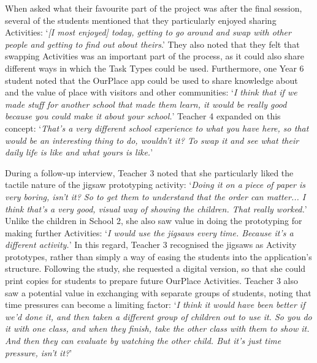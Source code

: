 \documentclass[,hyphens]{sigchi}
\begin{document}
When asked what their favourite part of the project was after the final session, several of the students mentioned that they particularly enjoyed sharing Activities: `\textit{[I most enjoyed] today, getting to go around and swap with other people and getting to find out about theirs}.' They also noted that they felt that swapping Activities was an important part of the process, as it could also share different ways in which the Task Types could be used. Furthermore, one Year 6 student noted that the OurPlace app could be used to share knowledge about and the value of place with visitors and other communities: `\textit{I think that if we made stuff for another school that made them learn, it would be really good because you could make it about your school.}' Teacher 4 expanded on this concept: `\textit{That's a very different school experience to what you have here, so that would be an interesting thing to do, wouldn't it? To swap it and see what their daily life is like and what yours is like.}' 

During a follow-up interview, Teacher 3 noted that she particularly liked the tactile nature of the jigsaw prototyping activity: `\textit{Doing it on a piece of paper is very boring, isn't it? So to get them to understand that the order can matter... I think that's a very good, visual way of showing the children. That really worked.}' Unlike the children in School 2, she also saw value in doing the prototyping for making further Activities: `\textit{I would use the jigsaws every time. Because it's a different activity.}' In this regard, Teacher 3 recognised the jigsaws as Activity prototypes, rather than simply a way of easing the students into the application's structure. Following the study, she requested a digital version, so that she could print copies for students to prepare future OurPlace Activities. Teacher 3 also saw a potential value in exchanging with separate groups of students, noting that time pressures can become a limiting factor: `\textit{I think it would have been better if we'd done it, and then taken a different group of children out to use it. So you do it with one class, and when they finish, take the other class with them to show it. And then they can evaluate by watching the other child. But it's just time pressure, isn't it?}'
\end{document}
